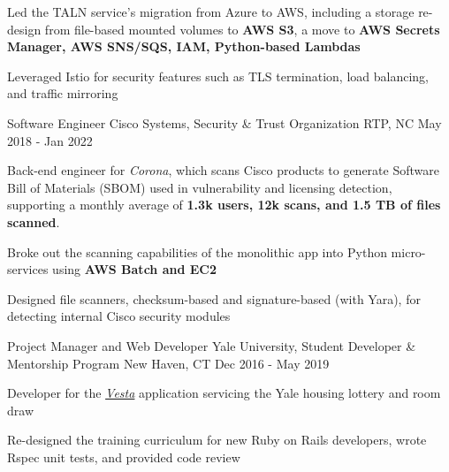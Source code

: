 \begin{cventries}
{\begin{cvitems}
{                \item Led the TALN service's migration from Azure to AWS, including a storage re-design from file-based mounted volumes to \textbf{AWS S3}, a move to \textbf{AWS Secrets Manager, AWS SNS/SQS, IAM, Python-based Lambdas}
                \item Leveraged Istio for security features such as TLS termination, load balancing, and traffic mirroring
            }{}
            \iftoggle{go}{
                \item Built \textit{TALN Updater} in Go, which propagates new e-mail scanning rules to hundreds of distributed TALN Kubernetes pods \textbf{every 5-15 minutes} to ensure best possible efficacy
            }{}
        \end{cvitems}
    }

  \cventry
    {Software Engineer} %
    {Cisco Systems, Security \& Trust Organization} %
    {RTP, NC} %
    {May 2018 - Jan 2022} %
    {
        Back-end engineer for \textit{Corona}, which scans Cisco products to generate Software Bill of Materials (SBOM) used in vulnerability and licensing detection, supporting a monthly average of \textbf{1.3k users, 12k scans, and 1.5 TB of files scanned}. \hfill \break
        \begin{cvitems} %
            \iftoggle{security}{
                \item Designed a security risk report webpage and API in Ruby on Rails for Cisco products to learn their vulnerability risk, CVEs, and mitigations
            }{
                \item Designed REST APIs for new user-driven features, and implemented bug fixes in Ruby on Rails
            }
            \item Broke out the scanning capabilities of the monolithic app into Python micro-services using \textbf{AWS Batch and EC2}
            \item Designed file scanners, checksum-based and signature-based (with Yara), for detecting internal Cisco security modules
        \end{cvitems}
    }

  \cventry
    {Project Manager and Web Developer} %
    {Yale University, Student Developer \& Mentorship Program} %
    {New Haven, CT} %
    {Dec 2016 - May 2019} %
    {
        Developer for the \href{https://gitlab.com/yale-sdmp/vesta}{\textit{Vesta}} application servicing the Yale housing lottery and room draw \hfill \break
        \begin{cvitems} %
            \item {Re-designed the training curriculum for new Ruby on Rails developers, wrote Rspec unit tests, and provided code review}
        \end{cvitems}
    }

\end{cventries}

